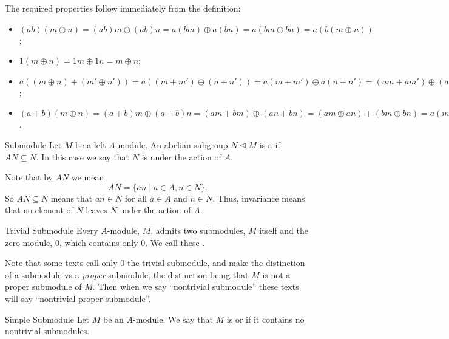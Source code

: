 The required properties follow immediately from the definition:
\begin{itemize}
    \item[M1] \((ab)(m \oplus n) = (ab)m \oplus (ab)n = a(bm) \oplus a(bn) = a(bm \oplus bn) = a(b(m \oplus n))\);
    \item[M2] \(1(m \oplus n) = 1m \oplus 1n = m \oplus n\);
    \item[M3] \(a((m \oplus n) + (m' \oplus n')) = a((m + m') \oplus (n + n')) = a(m + m') \oplus a(n + n') = (am + am') \oplus (an + an') = (am \oplus an) + (am' \oplus an') = a(m \oplus n) + a(m' \oplus n')\);
    \item[M4] \((a + b)(m \oplus n) = (a + b)m \oplus (a + b)n = (am + bm) \oplus (an + bn) = (am \oplus an) + (bm \oplus bn) = a(m \oplus n) + b(m \oplus n)\).
\end{itemize}

\begin{dfn}{Submodule}{}
    Let \(M\) be a left \(A\)-module.
    An abelian subgroup \(N \trianglelefteq M\) is a  if \(AN \subseteq N\).
    In this case we say that \(N\) is  under the action of \(A\).
\end{dfn}

Note that by \(AN\) we mean
\begin{equation}
    AN = \{an \mid a \in A , n \in N\}.
\end{equation}
So \(AN \subseteq N\) means that \(an \in N\) for all \(a \in A\) and \(n \in N\).
Thus, invariance means that no element of \(N\) leaves \(N\) under the action of \(A\).

\begin{dfn}{Trivial Submodule}{}
    Every \(A\)-module, \(M\), admits two submodules, \(M\) itself and the zero module, \(0\), which contains only \(0\).
    We call these .
\end{dfn}

Note that some texts call only \(0\) the trivial submodule, and make the distinction of a submodule vs a \emph{proper} submodule, the distinction being that \(M\) is not a proper submodule of \(M\).
Then when we say \enquote{nontrivial submodule} these texts will say \enquote{nontrivial proper submodule}.

\begin{dfn}{Simple Submodule}{}
    Let \(M\) be an \(A\)-module.
    We say that \(M\) is  or  if it contains no nontrivial submodules.
\end{dfn}

